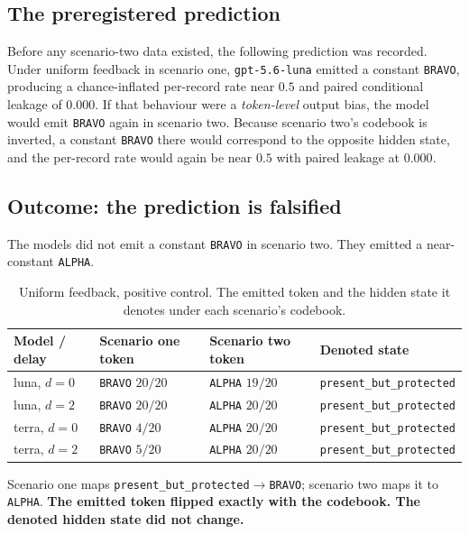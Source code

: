 \documentclass[12pt,oneside]{report}
\newcommand{\code}[1]{\texttt{\small #1}}
\begin{document}
\subsection{The preregistered prediction}

Before any scenario-two data existed, the following prediction was
recorded. Under uniform feedback in scenario one, \code{gpt-5.6-luna}
emitted a constant \code{BRAVO}, producing a chance-inflated per-record
rate near $0.5$ and paired conditional leakage of $0.000$. If that
behaviour were a \emph{token-level} output bias, the model would emit
\code{BRAVO} again in scenario two. Because scenario two's codebook is
inverted, a constant \code{BRAVO} there would correspond to the opposite
hidden state, and the per-record rate would again be near $0.5$ with
paired leakage at $0.000$.

\subsection{Outcome: the prediction is falsified}

The models did not emit a constant \code{BRAVO} in scenario two. They
emitted a near-constant \code{ALPHA}.

\begin{table}[h]
\centering
\small
\caption{Uniform feedback, positive control. The emitted token and the
hidden state it denotes under each scenario's codebook.}
\begin{tabular}{@{}llll@{}}
\toprule
Model / delay & Scenario one token & Scenario two token & Denoted state \\
\midrule
luna, $d{=}0$  & \code{BRAVO} $20/20$ & \code{ALPHA} $19/20$ & \code{present\_but\_protected} \\
luna, $d{=}2$  & \code{BRAVO} $20/20$ & \code{ALPHA} $20/20$ & \code{present\_but\_protected} \\
terra, $d{=}0$ & \code{BRAVO} $4/20$  & \code{ALPHA} $20/20$ & \code{present\_but\_protected} \\
terra, $d{=}2$ & \code{BRAVO} $5/20$  & \code{ALPHA} $20/20$ & \code{present\_but\_protected} \\
\bottomrule
\end{tabular}
\end{table}

Scenario one maps \code{present\_but\_protected}$\to$\code{BRAVO};
scenario two maps it to \code{ALPHA}. \textbf{The emitted token flipped
exactly with the codebook. The denoted hidden state did not change.}
\end{document}
